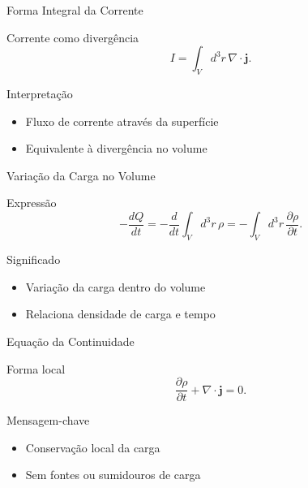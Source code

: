 \documentclass[aspectratio=169]{beamer}
\begin{document}
\begin{frame}{Forma Integral da Corrente}

\begin{block}{Corrente como divergência}
\begin{equation}
I = \int_V d^3 r \, \nabla \cdot \mathbf{j}.
\label{eq:2.11}
\tag{2.11}
\end{equation}
\end{block}

\begin{alertblock}{Interpretação}
\begin{itemize}
\item Fluxo de corrente através da superfície
\item Equivalente à divergência no volume
\end{itemize}
\end{alertblock}

\end{frame}

\begin{frame}{Variação da Carga no Volume}

\begin{block}{Expressão}
\begin{equation}
-\frac{dQ}{dt} 
= -\frac{d}{dt} \int_V d^3 r \, \rho 
= - \int_V d^3 r \, \frac{\partial \rho}{\partial t}.
\label{eq:2.12}
\tag{2.12}
\end{equation}
\end{block}

\begin{alertblock}{Significado}
\begin{itemize}
\item Variação da carga dentro do volume
\item Relaciona densidade de carga e tempo
\end{itemize}
\end{alertblock}

\end{frame}

\begin{frame}{Equação da Continuidade}

\begin{block}{Forma local}
\begin{equation}
\frac{\partial \rho}{\partial t} + \nabla \cdot \mathbf{j} = 0.
\label{eq:2.13}
\tag{2.13}
\end{equation}
\end{block}

\begin{alertblock}{Mensagem-chave}
\begin{itemize}
\item Conservação local da carga
\item Sem fontes ou sumidouros de carga
\end{itemize}
\end{alertblock}

\end{frame}
\end{document}

